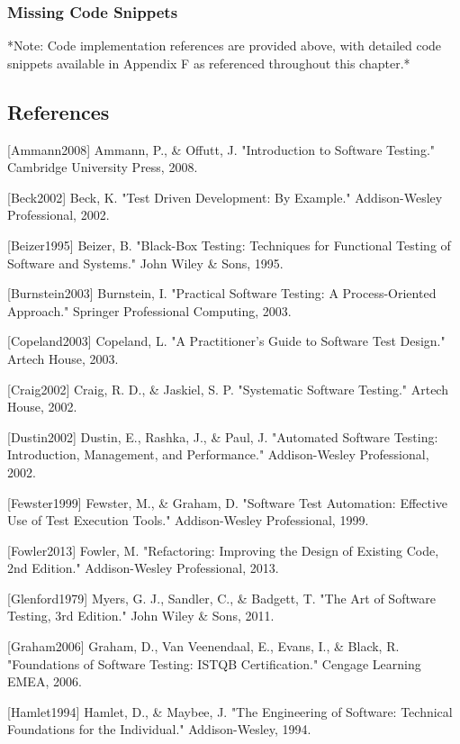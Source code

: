 \documentclass[12pt,a4paper]{article}
\begin{document}
\subsubsection{Missing Code Snippets}

*Note: Code implementation references are provided above, with detailed code snippets available in Appendix F as
referenced throughout this chapter.*

\subsection{References}

[Ammann2008] Ammann, P., \& Offutt, J. "Introduction to Software Testing." Cambridge University Press, 2008.

[Beck2002] Beck, K. "Test Driven Development: By Example." Addison-Wesley Professional, 2002.

[Beizer1995] Beizer, B. "Black-Box Testing: Techniques for Functional Testing of Software and Systems." John Wiley \&
Sons, 1995.

[Burnstein2003] Burnstein, I. "Practical Software Testing: A Process-Oriented Approach." Springer Professional
Computing, 2003.

[Copeland2003] Copeland, L. "A Practitioner's Guide to Software Test Design." Artech House, 2003.

[Craig2002] Craig, R. D., \& Jaskiel, S. P. "Systematic Software Testing." Artech House, 2002.

[Dustin2002] Dustin, E., Rashka, J., \& Paul, J. "Automated Software Testing: Introduction, Management, and Performance."
Addison-Wesley Professional, 2002.

[Fewster1999] Fewster, M., \& Graham, D. "Software Test Automation: Effective Use of Test Execution Tools."
Addison-Wesley Professional, 1999.

[Fowler2013] Fowler, M. "Refactoring: Improving the Design of Existing Code, 2nd Edition." Addison-Wesley Professional,
2013.

[Glenford1979] Myers, G. J., Sandler, C., \& Badgett, T. "The Art of Software Testing, 3rd Edition." John Wiley \& Sons,
2011.

[Graham2006] Graham, D., Van Veenendaal, E., Evans, I., \& Black, R. "Foundations of Software Testing: ISTQB
Certification." Cengage Learning EMEA, 2006.

[Hamlet1994] Hamlet, D., \& Maybee, J. "The Engineering of Software: Technical Foundations for the Individual."
Addison-Wesley, 1994.
\end{document}
